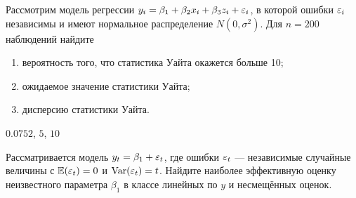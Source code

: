 \begin{problem}
Рассмотрим модель регрессии $y_i=\beta_1+\beta_2 x_i + \beta_3 z_i+\varepsilon_i$, в которой
ошибки $\varepsilon_i$ независимы и имеют нормальное распределение $N(0,\sigma^2)$. Для $n = 200$ наблюдений найдите
\begin{enumerate}
\item вероятность того, что статистика Уайта окажется больше 10;
\item ожидаемое значение статистики Уайта;
\item дисперсию статистики Уайта.
\end{enumerate}


\begin{sol}
$0.0752$, $5$, $10$
\end{sol}
\end{problem}


\begin{problem}
Рассматривается модель $y_t=\beta_1+\varepsilon_t$, где ошибки $\varepsilon_t$  — независимые
случайные величины с $\operatorname{\mathbb E}(\varepsilon_t)=0$ и $\operatorname{Var}(\varepsilon_t)=t$. Найдите наиболее эффективную
оценку неизвестного параметра $\beta_1$ в классе линейных по $y$ и несмещённых оценок.

\begin{sol}
\end{sol}
\end{problem}


